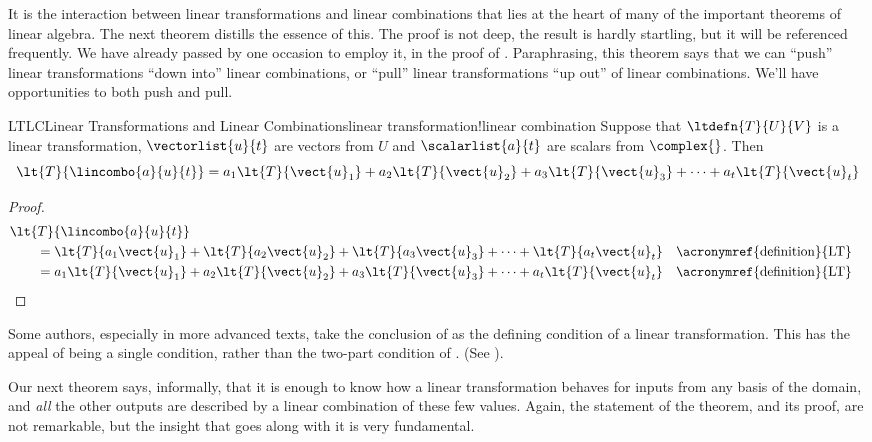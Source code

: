 %
%
%
It is the interaction between linear transformations and linear combinations that lies at the heart of many of the important theorems of linear algebra.  The next theorem distills the essence of this.  The proof is not deep, the result is hardly startling, but it will be referenced frequently.  We have already passed by one occasion to employ it, in the proof of .  Paraphrasing, this theorem says that we can ``push'' linear transformations ``down into'' linear combinations, or ``pull'' linear transformations ``up out'' of linear combinations.  We'll have opportunities to both push and pull.
%
\begin{theorem}{LTLC}{Linear Transformations and Linear Combinations}{linear transformation!linear combination}
Suppose that $\ltdefn{T}{U}{V}$ is a linear transformation, $\vectorlist{u}{t}$ are vectors from $U$ and $\scalarlist{a}{t}$ are scalars from $\complex{\null}$.  Then
%
\begin{equation*}
\lt{T}{\lincombo{a}{u}{t}}
=
a_1\lt{T}{\vect{u}_1}+
a_2\lt{T}{\vect{u}_2}+
a_3\lt{T}{\vect{u}_3}+\cdots+
a_t\lt{T}{\vect{u}_t}
\end{equation*}
%
\end{theorem}
%
\begin{proof}
%
\begin{align*}
&\lt{T}{\lincombo{a}{u}{t}}\\
&\quad\quad=
\lt{T}{a_1\vect{u}_1}+
\lt{T}{a_2\vect{u}_2}+
\lt{T}{a_3\vect{u}_3}+\cdots+
\lt{T}{a_t\vect{u}_t}&&\text{\acronymref{definition}{LT}}\\
&\quad\quad=
a_1\lt{T}{\vect{u}_1}+
a_2\lt{T}{\vect{u}_2}+
a_3\lt{T}{\vect{u}_3}+\cdots+
a_t\lt{T}{\vect{u}_t}&&\text{\acronymref{definition}{LT}}
\end{align*}
%
\end{proof}
%
Some authors, especially in more advanced texts, take the conclusion of  as the defining condition of a linear transformation.  This has the appeal of being a single condition, rather than the two-part condition of .  (See ).\par
%
Our next theorem says, informally, that it is enough to know how a linear transformation behaves for inputs from any basis of the domain, and {\em all} the other outputs are described by a linear combination of these few values.  Again, the statement of the theorem, and its proof, are not remarkable, but the insight that goes along with it is very fundamental.
